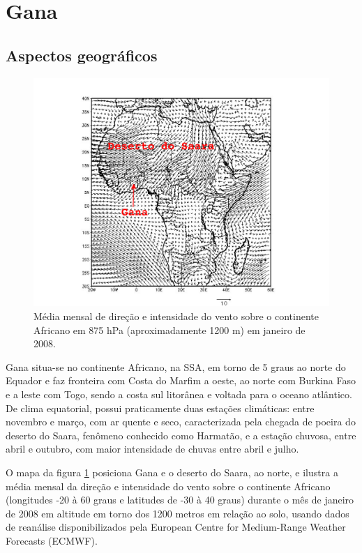\newpage
\section{Gana}

\subsection{Aspectos geográficos}

\begin{figure}[H]
  \centering
  \includegraphics[width=\textwidth]{../inputs/grads/gimp/875hPa/JAN_2008.pdf}
  \caption{Média mensal de direção e intensidade do vento sobre o continente 
           Africano em 875 hPa (aproximadamente 1200 m) em janeiro de 2008.
          \label{fg:ECMWFjan2008}}
\end{figure}

Gana situa-se no continente Africano, na SSA, em torno de 5 graus ao norte 
do Equador e  faz fronteira com Costa do Marfim a oeste, ao norte com Burkina
Faso e a leste com Togo, sendo a costa sul litorânea e voltada para o oceano 
atlântico.
De clima equatorial, possui praticamente duas estações climáticas: 
entre novembro e março, com ar quente e seco, caracterizada pela chegada de
poeira do deserto do Saara, fenômeno conhecido como Harmatão, e a estação 
chuvosa, entre abril e outubro, com maior intensidade de chuvas 
entre abril e julho. 

O mapa da figura \ref{fg:ECMWFjan2008} posiciona Gana e o deserto do Saara, 
ao norte, e ilustra a média mensal da direção e intensidade do vento 
sobre o continente Africano (longitudes -20 à 60 graus e latitudes de -30 à 40 
graus) durante o mês de janeiro de 2008 em altitude em torno dos 1200 metros 
em relação ao solo, usando dados de reanálise disponibilizados pela 
European Centre for Medium-Range Weather Forecasts (ECMWF). 

